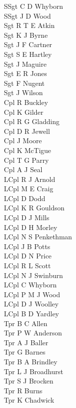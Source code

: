\begin{multicols}{4}
  \scriptsize
  \noindent
  SSgt C D Whyborn \\
  SSgt J D Wood \\
  Sgt R T E Atkin \\
  Sgt K J Byrne \\
  Sgt J F Cartner \\
  Sgt S E Hartley \\
  Sgt J Maguire \\
  Sgt E R Jones \\
  Sgt F Nugent \\
  Sgt J Wilson \\
  Cpl R Buckley \\
  Cpl K Gilder \\
  Cpl R G Gladding \\
  Cpl D R Jewell \\
  Cpl J Moore \\
  Cpl K McTigue \\
  Cpl T G Parry \\
  Cpl A J Seal \\
  LCpl R J Arnold \\
  LCpl M E Craig \\
  LCpl D Dodd \\
  LCpl K R Gouldson \\
  LCpl D J Mills \\
  LCpl D H Morley \\
  LCpl N S Penkethman \\
  LCpl J B Potts \\
  LCpl D N Price \\
  LCpl R L Scott \\
  LCpl N J Swinburn \\
  LCpl C Whyborn \\
  LCpl P M J Wood \\
  LCpl D J Woolley \\
  LCpl B D Yardley \\
  Tpr B C Allen \\
  Tpr P W Anderson \\
  Tpr A J Baller \\
  Tpr G Barnes \\
  Tpr B A Brindley \\
  Tpr L J Broadhurst \\
  Tpr S J Brocken \\
  Tpr R Burns \\
  Tpr K Chadwick \\

\end{multicols}
